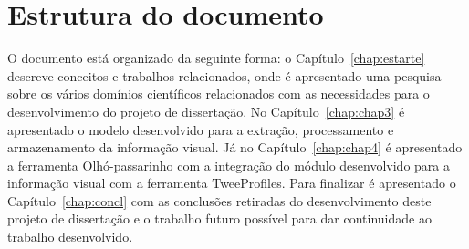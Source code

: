  

\section{Estrutura do documento} \label{sec:struct}

O documento está organizado da seguinte forma: o Capítulo~\ref{chap:estarte} descreve conceitos e trabalhos relacionados, onde é apresentado uma pesquisa sobre os vários domínios científicos relacionados com as necessidades para o desenvolvimento do projeto de dissertação. No Capítulo~\ref{chap:chap3} é apresentado o modelo desenvolvido para a extração, processamento e armazenamento da informação visual. Já no Capítulo~\ref{chap:chap4} é apresentado a ferramenta Olhó-passarinho com a integração do módulo desenvolvido para a informação visual com a ferramenta TweeProfiles. Para finalizar é apresentado o Capítulo~\ref{chap:concl} com as conclusões retiradas do desenvolvimento deste projeto de dissertação e o trabalho futuro possível para dar continuidade ao trabalho desenvolvido.

 
